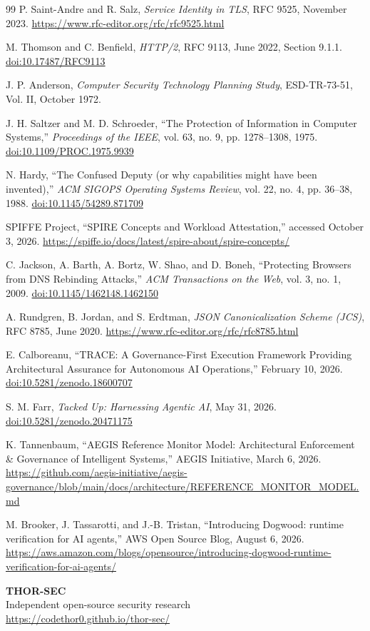 \documentclass[11pt,letterpaper]{article}
\newcommand{\doiurl}[1]{\href{https://doi.org/#1}{doi:#1}}
\begin{document}
\begin{thebibliography}{99}
 P. Saint-Andre and R. Salz, \emph{Service Identity in TLS}, RFC 9525, November 2023. \url{https://www.rfc-editor.org/rfc/rfc9525.html}

 M. Thomson and C. Benfield, \emph{HTTP/2}, RFC 9113, June 2022, Section 9.1.1. \doiurl{10.17487/RFC9113}

 J. P. Anderson, \emph{Computer Security Technology Planning Study}, ESD-TR-73-51, Vol. II, October 1972.

 J. H. Saltzer and M. D. Schroeder, ``The Protection of Information in Computer Systems,'' \emph{Proceedings of the IEEE}, vol. 63, no. 9, pp. 1278--1308, 1975. \doiurl{10.1109/PROC.1975.9939}

 N. Hardy, ``The Confused Deputy (or why capabilities might have been invented),'' \emph{ACM SIGOPS Operating Systems Review}, vol. 22, no. 4, pp. 36--38, 1988. \doiurl{10.1145/54289.871709}

 SPIFFE Project, ``SPIRE Concepts and Workload Attestation,'' accessed October 3, 2026. \url{https://spiffe.io/docs/latest/spire-about/spire-concepts/}

 C. Jackson, A. Barth, A. Bortz, W. Shao, and D. Boneh, ``Protecting Browsers from DNS Rebinding Attacks,'' \emph{ACM Transactions on the Web}, vol. 3, no. 1, 2009. \doiurl{10.1145/1462148.1462150}

 A. Rundgren, B. Jordan, and S. Erdtman, \emph{JSON Canonicalization Scheme (JCS)}, RFC 8785, June 2020. \url{https://www.rfc-editor.org/rfc/rfc8785.html}

 E. Calboreanu, ``TRACE: A Governance-First Execution Framework Providing Architectural Assurance for Autonomous AI Operations,'' February 10, 2026. \doiurl{10.5281/zenodo.18600707}

 S. M. Farr, \emph{Tacked Up: Harnessing Agentic AI}, May 31, 2026. \doiurl{10.5281/zenodo.20471175}

 K. Tannenbaum, ``AEGIS Reference Monitor Model: Architectural Enforcement \& Governance of Intelligent Systems,'' AEGIS Initiative, March 6, 2026. \url{https://github.com/aegis-initiative/aegis-governance/blob/main/docs/architecture/REFERENCE_MONITOR_MODEL.md}

 M. Brooker, J. Tassarotti, and J.-B. Tristan, ``Introducing Dogwood: runtime verification for AI agents,'' AWS Open Source Blog, August 6, 2026. \url{https://aws.amazon.com/blogs/opensource/introducing-dogwood-runtime-verification-for-ai-agents/}

\end{thebibliography}

\vfill
\begin{center}
\small \textbf{THOR-SEC} \\ Independent open-source security research \\ \url{https://codethor0.github.io/thor-sec/}
\end{center}
\end{document}
